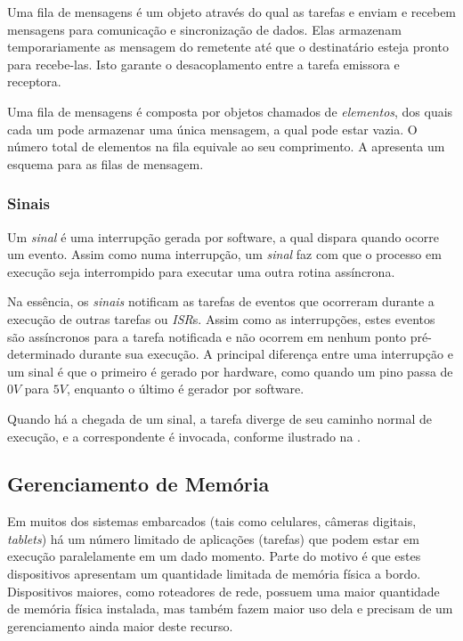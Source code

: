 Uma fila de mensagens é um objeto através do qual as tarefas e  enviam e recebem mensagens para comunicação e sincronização de dados. Elas armazenam temporariamente as mensagem do remetente até que o destinatário esteja pronto para recebe-las. Isto garante o desacoplamento entre a tarefa emissora e receptora.

Uma fila de mensagens é composta por objetos chamados de \emph{elementos}, dos quais cada um pode armazenar uma única mensagem, a qual pode estar vazia. O número total de elementos na fila equivale ao seu comprimento. A  apresenta um esquema para as filas de mensagem.


\subsubsection{Sinais}

Um \emph{sinal} é uma interrupção gerada por software, a qual dispara quando ocorre um evento. Assim como numa interrupção, um \emph{sinal} faz com que o processo em execução seja interrompido para executar uma outra rotina assíncrona.

Na essência, os \emph{sinais} notificam as tarefas de eventos que ocorreram durante a execução de outras tarefas ou \emph{ISR}s. Assim como as interrupções, estes eventos são assíncronos para a tarefa notificada e não ocorrem em nenhum ponto pré-determinado durante sua execução. A principal diferença entre uma interrupção e um sinal é que o primeiro é gerado por hardware, como quando um pino passa de $0V$ para $5V$, enquanto o último é gerador por software.

Quando há a chegada de um sinal, a tarefa diverge de seu caminho normal de execução, e a  correspondente é invocada, conforme ilustrado na .


\subsection{Gerenciamento de Memória}

Em muitos dos sistemas embarcados (tais como celulares, câmeras digitais, \emph{tablets}) há um número limitado de aplicações (tarefas) que  podem estar em execução paralelamente em um dado momento. Parte do motivo é que estes dispositivos apresentam um quantidade limitada de memória física a bordo. Dispositivos maiores, como roteadores de rede, possuem uma maior quantidade de memória física instalada, mas também fazem maior uso dela e precisam de um gerenciamento ainda maior deste recurso.


